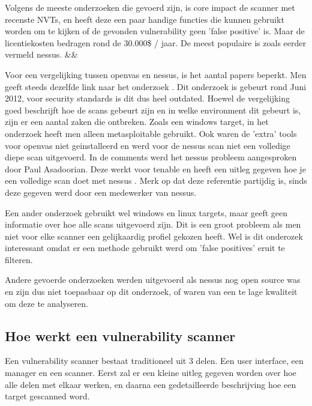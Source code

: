 Volgens de meeste onderzoeken die gevoerd zijn, is core impact de scanner met recenste NVTs, en heeft deze een paar handige functies die kunnen gebruikt worden om te kijken of de gevonden vulnerability geen 'false positive' is. Maar de licentiekosten bedragen rond de 30.000\$ / jaar. De meest populaire is zoals eerder vermeld nessus. \textcite{Concise} \&\& \textcite{Sectools} 

Voor een vergelijking tussen openvas en nessus, is het aantal papers beperkt. Men geeft steeds dezelfde link naar het onderzoek \textcite{Hackertarget}. Dit onderzoek is gebeurt rond Juni 2012, voor security standards is dit dus heel outdated. Hoewel de vergelijking goed beschrijft hoe de scans gebeurt zijn en in welke environment dit gebeurt is, zijn er een aantal zaken die ontbreken. Zoals een windows target, in het onderzoek heeft men alleen metasploitable gebruikt. Ook waren de 'extra' tools voor openvas niet geinstalleerd en werd voor de nessus scan niet een volledige diepe scan uitgevoerd. In de comments werd het nessus probleem aangesproken door Paul Asadoorian. Deze werkt voor tenable en heeft een uitleg gegeven hoe je een volledige scan doet met nessus \textcite{Securityweekly}. Merk op dat deze referentie partijdig is, sinds deze gegeven werd door een medewerker van nessus.

Een ander onderzoek \textcite{Rageweb} gebruikt wel windows en linux targets, maar geeft geen informatie over hoe alle scans uitgevoerd zijn. Dit is een groot probleem als men niet voor elke scanner een gelijkaardig profiel gekozen heeft. Wel is dit onderozek interessant omdat er een methode gebruikt werd om 'false positives' eruit te filteren.

Andere gevoerde onderzoeken werden uitgevoerd als nessus nog open source was en zijn dus niet toepasbaar op dit onderzoek, of waren van een te lage kwaliteit om deze te analyseren. 

\subsection{Hoe werkt een vulnerability scanner}


Een vulnerability scanner bestaat traditioneel uit 3 delen. Een user interface, een manager en een scanner. Eerst zal er een kleine uitleg gegeven worden over hoe alle delen met elkaar werken, en daarna een gedetailleerde beschrijving hoe een target gescanned word.
 
